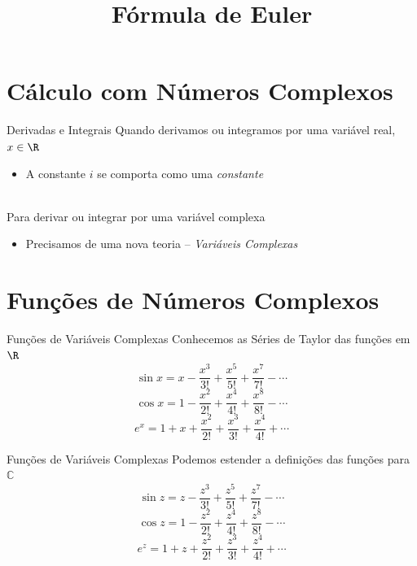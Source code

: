 \documentclass[fleqn,utf8,aspectratio=169,12pt,ignorenonframetext]{beamer}
\title{Fórmula de Euler}
\begin{document}
\addtitle

\section{Cálculo com Números Complexos}

\begin{frame}{Derivadas e Integrais}
  Quando derivamos ou integramos por uma variável real, $x\in\R$
  \pause
  \begin{itemize}
    \item A constante \emph{\(i\)} se comporta como uma \emph{constante}
  \end{itemize}~\\

  \pause
  Para derivar ou integrar por uma variável complexa
  \pause
  \begin{itemize}
    \item Precisamos de uma nova teoria
    \pause
    --\emph{ Variáveis Complexas}
  \end{itemize}
\end{frame}

\section{Funções de Números Complexos}

\begin{frame}{Funções de Variáveis Complexas}
  Conhecemos as Séries de Taylor das funções em $\R$
  \pause
  \[
    \sin x = x - \frac{x^3}{3!} + \frac{x^5}{5!} + \frac{x^7}{7!} - \cdots
  \]
  \pause
  \[
    \cos x = 1 - \frac{x^2}{2!} + \frac{x^4}{4!} + \frac{x^8}{8!} - \cdots
  \]
  \pause
  \[
    e^x = 1 + x + \frac{x^2}{2!} + \frac{x^3}{3!} + \frac{x^4}{4!} +  \cdots
  \]
\end{frame}

\begin{frame}{Funções de Variáveis Complexas}
  Podemos estender a definições das funções para \(\mathbb{C}\)
  \pause
  \[
    \sin z = z - \frac{z^3}{3!} + \frac{z^5}{5!} + \frac{z^7}{7!} - \cdots
  \]
  \pause
  \[
    \cos z = 1 - \frac{z^2}{2!} + \frac{z^4}{4!} + \frac{z^8}{8!} - \cdots
  \]
  \pause
  \[
    e^z = 1 + z + \frac{z^2}{2!} + \frac{z^3}{3!} + \frac{z^4}{4!} +  \cdots
  \]
\end{frame}
\end{document}

